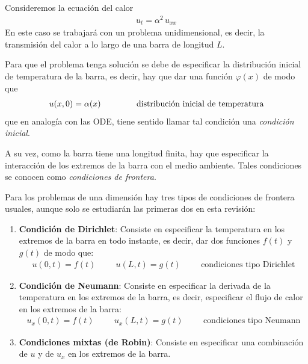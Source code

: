 Consideremos la ecuación del calor
\begin{align*}
u_{t} =  \alpha^{2} \,  u_{xx}
\end{align*}
En este caso se trabajará con un problema unidimensional, es decir, la transmisión del calor a lo largo de una barra de longitud $L$.
\par
Para que el problema tenga solución se debe de especificar la distribución inicial de temperatura de la barra, es decir, hay que dar una función $\varphi (x)$ de modo que
\begin{align}
u(x, 0) = \alpha (x) \hspace{1.5cm} \mbox{distribución inicial de temperatura}
\label{eq:ecuacion_06_02_02}
\end{align}
que en analogía con las ODE, tiene sentido llamar tal condición una \emph{condición inicial}.
\par
A su vez, como la barra tiene una longitud finita, hay que especificar la interacción de los extremos de la barra con el medio ambiente. Tales condiciones se conocen como \emph{condiciones de frontera}.
\par
Para los problemas de una dimensión hay tres tipos de condiciones de frontera usuales, aunque solo se estudiarán las primeras dos en esta revisión:
\begin{enumerate}
\item \textbf{Condición de Dirichlet}: Consiste en especificar la temperatura en los extremos de la barra en todo instante, es decir, dar dos funciones $f(t)$ y $g(t)$ de modo que:
\begin{align}
u(0, t) = f (t)  \hspace{1cm} u(L, t) = g(t) \hspace{1cm} \mbox{condiciones tipo Dirichlet}
\label{eq:ecuacion_06_02_03}    
\end{align}
\item \textbf{Condición de Neumann}: Consiste en especificar la derivada de la temperatura en los extremos de la barra, es decir, especificar el flujo de calor en los extremos de la barra:
\begin{align}
u_{x}(0,t) = f(t) \hspace{1cm} u_{x}(L,t) = g(t) \hspace{1cm} \mbox{condiciones tipo Neumann}
\label{eq:ecuacion_06_02_04}    
\end{align}
\item \textbf{Condiciones mixtas (de Robin)}: Consiste en especificar una combinación de $u$ y de $u_{x}$ en los extremos de la barra.
\end{enumerate}

